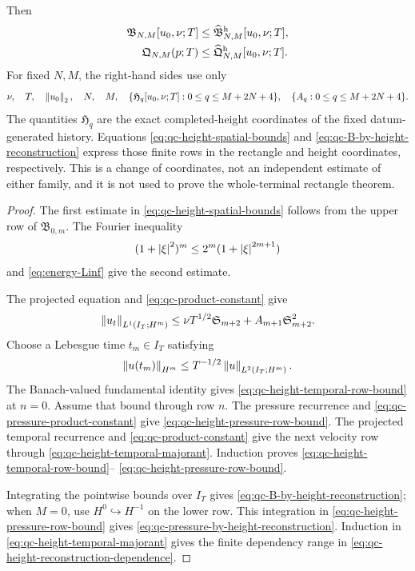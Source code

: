 \begin{proposition}
Then
\begin{align}
 \mathfrak B_{N,M}[u_0,\nu;T]
 &\le\widehat{\mathfrak B}_{N,M}^{\rm h}[u_0,\nu;T],
 \label{eq:qc-B-by-height-reconstruction}\\
 \mathfrak Q_{N,M}(p;T)
 &\le\widehat{\mathfrak Q}_{N,M}^{\rm h}[u_0,\nu;T].
 \label{eq:qc-pressure-by-height-reconstruction}
\end{align}
For fixed \(N,M\), the right-hand sides use only
\begin{equation}
 \nu,\quad T,\quad\left\lVert u_0\right\rVert_2,\quad N,\quad M,\quad
 \{\mathfrak H_q[u_0,\nu;T]:0\le q\le M+2N+4\},
 \quad\{A_q:0\le q\le M+2N+4\}.
 \label{eq:qc-height-reconstruction-dependence}
\end{equation}
The quantities \(\mathfrak H_q\) are the exact completed-height coordinates
of the fixed datum-generated history.  Equations
\eqref{eq:qc-height-spatial-bounds} and
\eqref{eq:qc-B-by-height-reconstruction} express those finite rows in the
rectangle and height coordinates, respectively.  This is a change of
coordinates, not an independent estimate of either family, and it is not used
to prove the whole-terminal rectangle theorem.
\end{proposition}

\begin{proof}
The first estimate in \eqref{eq:qc-height-spatial-bounds} follows from the
upper row of \(\mathfrak B_{0,m}\).  The Fourier inequality
\[
 (1+\left|\xi\right|^2)^m\le2^m(1+\left|\xi\right|^{2m+1})
\]
and \eqref{eq:energy-Linf} give the second estimate.

The projected equation and \eqref{eq:qc-product-constant} give
\[
 \left\lVert u_t\right\rVert_{L^1(I_T;H^m)}
 \le\nu T^{1/2}\mathfrak S_{m+2}
 +A_{m+1}\mathfrak S_{m+2}^2.
\]
Choose a Lebesgue time \(t_m\in I_T\) satisfying
\[
 \left\lVert u(t_m)\right\rVert_{H^m}
 \le T^{-1/2}\left\lVert u\right\rVert_{L^2(I_T;H^m)}.
\]
The Banach-valued fundamental identity gives
\eqref{eq:qc-height-temporal-row-bound} at \(n=0\).
Assume that bound through row \(n\).  The pressure recurrence and
\eqref{eq:qc-pressure-product-constant} give
\eqref{eq:qc-height-pressure-row-bound}.  The projected temporal recurrence
and \eqref{eq:qc-product-constant} give the next velocity row through
\eqref{eq:qc-height-temporal-majorant}.  Induction proves
\eqref{eq:qc-height-temporal-row-bound}--%
\eqref{eq:qc-height-pressure-row-bound}.

Integrating the pointwise bounds over \(I_T\) gives
\eqref{eq:qc-B-by-height-reconstruction}; when \(M=0\), use
\(H^0\hookrightarrow H^{-1}\) on the lower row.  This integration in
\eqref{eq:qc-height-pressure-row-bound} gives
\eqref{eq:qc-pressure-by-height-reconstruction}.  Induction in
\eqref{eq:qc-height-temporal-majorant} gives the finite dependency range in
\eqref{eq:qc-height-reconstruction-dependence}.
\end{proof}

